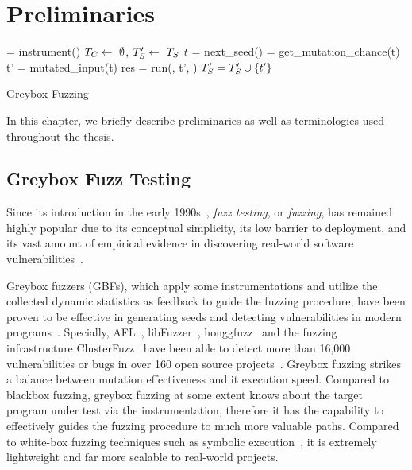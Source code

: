 \chapter{Preliminaries} \label{ch:preliminaries}

\begin{algorithm}[t]
 \small
{}
	\Prog = instrument(\ProgO) 
	$T_{C} \leftarrow~\emptyset$, $T^{\prime}_{S} \leftarrow~T_{S}$\; 
	 {
		$t$ = next\_seed(\FinalSeeds) 
		\mutChance = get\_mutation\_chance(t)  \label{line:algo:energy}
		 {
			t' = mutated\_input(t)  
			res = run(\Prog, t', \Ncal)
			 {\label{line:algo:new_cov}
				$T^{\prime}_{S} = T^{\prime}_{S}\cup\{t'\}$  \label{line:algo:triage_end}
			}
		}
	}
	\caption{Greybox Fuzzing}\label{algo:gbf}
\end{algorithm}

In this chapter, we briefly describe preliminaries as well as terminologies used throughout the thesis.

\section{Greybox Fuzz Testing}\label{sec:intro-gbf}
Since its introduction in the early 1990s~\cite{fuzzing1990}, \emph{fuzz testing}, or \emph{fuzzing}, has remained highly popular due to its conceptual simplicity, its low barrier to deployment, and its vast amount of empirical evidence in discovering real-world software vulnerabilities~\cite{fuzz_survey}.

Greybox fuzzers (GBFs), which apply some instrumentations and utilize the collected dynamic statistics as feedback to guide the fuzzing procedure, have been proven to be effective in generating seeds and detecting vulnerabilities in modern programs~\cite{fuzz_survey}. Specially, AFL~\cite{afl}, libFuzzer~\cite{libfuzzer}, honggfuzz~\cite{honggfuzz} and the fuzzing infrastructure ClusterFuzz~\cite{clusterfuzz} have been able to detect more than 16,000 vulnerabilities or bugs in over 160 open source projects~\cite{afl,clusterfuzz}. Greybox fuzzing strikes a balance between mutation effectiveness and it execution speed. Compared to blackbox fuzzing, greybox fuzzing at some extent knows about the target program under test via the instrumentation, therefore it has the capability to effectively guides the fuzzing procedure to much more valuable paths. Compared to white-box fuzzing techniques such as symbolic execution~\cite{dart,klee}, it is extremely lightweight and far more scalable to real-world projects.


